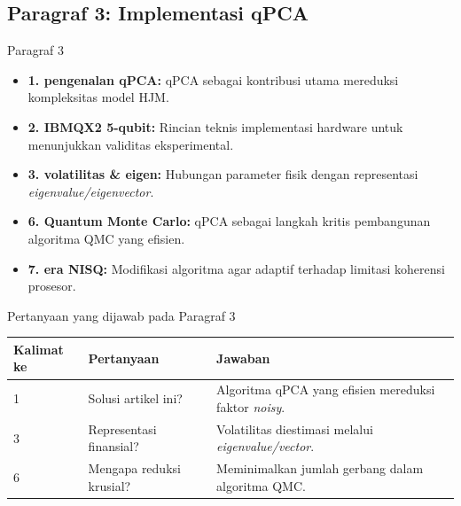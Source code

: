 \subsection{Paragraf 3: Implementasi qPCA}
\begin{frame}{Paragraf 3}
    \begin{itemize}
        \item \textbf{1. pengenalan qPCA:} qPCA sebagai kontribusi utama mereduksi kompleksitas model HJM.
        \item \textbf{2. IBMQX2 5-qubit:} Rincian teknis implementasi hardware untuk menunjukkan validitas eksperimental.
        \item \textbf{3. volatilitas \& eigen:} Hubungan parameter fisik dengan representasi \textit{eigenvalue/eigenvector}.
        \item \textbf{6. Quantum Monte Carlo:} qPCA sebagai langkah kritis pembangunan algoritma QMC yang efisien.
        \item \textbf{7. era NISQ:} Modifikasi algoritma agar adaptif terhadap limitasi koherensi prosesor.
    \end{itemize}
\end{frame}

\begin{frame}{Pertanyaan yang dijawab pada Paragraf 3}
    \centering
    \small
    \begin{tabular}{lp{4.5cm}p{6cm}}
        \toprule
        Kalimat ke & Pertanyaan & Jawaban \\
        \midrule
        1 & Solusi artikel ini? & Algoritma qPCA yang efisien mereduksi faktor \textit{noisy}. \\
        3 & Representasi finansial? & Volatilitas diestimasi melalui \textit{eigenvalue/vector}. \\
        6 & Mengapa reduksi krusial? & Meminimalkan jumlah gerbang dalam algoritma QMC. \\
        \bottomrule
    \end{tabular}
\end{frame}

